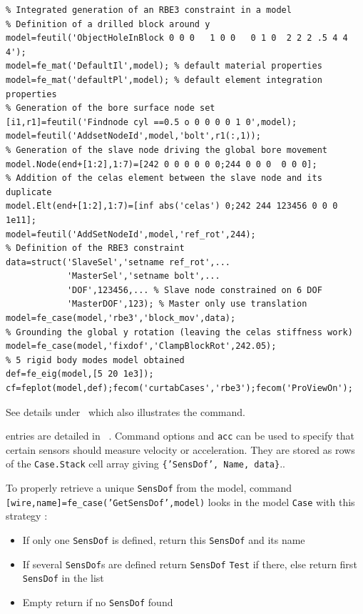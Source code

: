 \begin{verbatim}
% Integrated generation of an RBE3 constraint in a model
% Definition of a drilled block around y
model=feutil('ObjectHoleInBlock 0 0 0   1 0 0   0 1 0  2 2 2 .5 4 4 4'); 
model=fe_mat('DefaultIl',model); % default material properties
model=fe_mat('defaultPl',model); % default element integration properties
% Generation of the bore surface node set
[i1,r1]=feutil('Findnode cyl ==0.5 o 0 0 0 0 1 0',model);
model=feutil('AddsetNodeId',model,'bolt',r1(:,1));
% Generation of the slave node driving the global bore movement
model.Node(end+[1:2],1:7)=[242 0 0 0 0 0 0;244 0 0 0  0 0 0];
% Addition of the celas element between the slave node and its duplicate
model.Elt(end+[1:2],1:7)=[inf abs('celas') 0;242 244 123456 0 0 0 1e11];
model=feutil('AddSetNodeId',model,'ref_rot',244);
% Definition of the RBE3 constraint
data=struct('SlaveSel','setname ref_rot',...
            'MasterSel','setname bolt',...
            'DOF',123456,... % Slave node constrained on 6 DOF
            'MasterDOF',123); % Master only use translation
model=fe_case(model,'rbe3','block_mov',data);
% Grounding the global y rotation (leaving the celas stiffness work)
model=fe_case(model,'fixdof','ClampBlockRot',242.05);
% 5 rigid body modes model obtained
def=fe_eig(model,[5 20 1e3]);
cf=feplot(model,def);fecom('curtabCases','rbe3');fecom('ProViewOn');
\end{verbatim}%



See details under \rigid\ which also illustrates the  command.


 entries are detailed in ~. Command options  and {\tt acc} can be used to specify that certain sensors should measure velocity or acceleration. They are stored as rows of the {\tt Case.Stack} cell array giving {\tt \{'SensDof', Name, data\}}.. 

To properly retrieve a unique {\tt SensDof} from the model, command {\tt [wire,name]=fe\_case('GetSensDof',model)} looks in the model {\tt Case} with this strategy :
\begin{itemize}
\item If only one {\tt SensDof} is defined, return this {\tt SensDof} and its name
\item If several {\tt SensDof}s are defined return {\tt SensDof} {\tt Test} if there, else return first {\tt SensDof} in the list
\item Empty return if no {\tt SensDof} found
\end{itemize}

